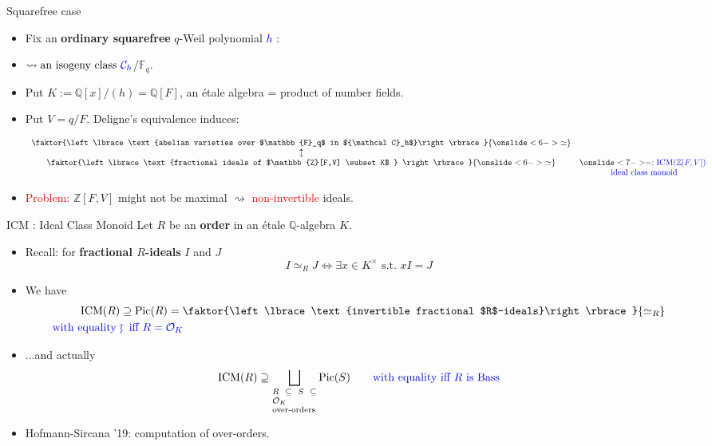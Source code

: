 \documentclass[usenames,dvipsnames,handout]{beamer}
\def\Q{\mathbb{Q}}
\def\Z{\mathbb{Z}}
\def\F{\mathbb{F}}
\DeclareMathOperator{\ICM}{ICM}
\DeclareMathOperator{\Pic}{Pic}
\newcommand{\cC}{{\mathcal C}}
\newcommand{\cO}{{\mathcal O}}
\newcommand{\set}[1]{\left\lbrace#1\right\rbrace }
\newcommand{\red}[1]{\textcolor{red}{#1}}
\newcommand{\blue}[1]{\textcolor{blue}{#1}}
\begin{document}
\begin{frame}{Squarefree case}
	\begin{itemize}
	\item Fix an \textbf{ordinary squarefree} $q$-Weil polynomial \blue{$h$} :
    \item  $\rightsquigarrow \text{an isogeny class } \blue{\cC_h}$/$\F_q$.
    \item Put $K := \Q[x]/(h)=\Q[F]$, an \'etale algebra = product of number fields.
	\item Put $V=q/F$. Deligne's equivalence induces:
			\begin{theorem}
			\[\begin{array}{cc}
			\faktor{\set{\text{abelian varieties over $\F_q$ in $\cC_h$}}}{
\onslide<6->{\simeq}
            } & \\
			\updownarrow & \\
			\faktor{\set{ \text{fractional ideals of $\Z[F,V] \subset K$ } }}{
\onslide<6->{\simeq}
             } &
\onslide<7-> =:  \blue{\ICM(\Z[F,V])}\\ 
			& \blue{\text{ ideal class monoid} }
			  \end{array}\]
			\end{theorem}
    \item \red{Problem:} $\Z[F,V]$ might not be maximal $\rightsquigarrow $ \red{non-invertible} ideals.
	\end{itemize}
\end{frame}

\begin{frame}{ICM : Ideal Class Monoid}
    Let $R$ be an {\bf order} in an \'etale  $\Q$-algebra $K$.
    \begin{itemize}
\pause
    \item Recall: for {\bf fractional $R$-ideals} $I$ and $J$
	 \[ I\simeq_R J \Longleftrightarrow \exists x \in K^\times \text{ s.t.~} xI=J \]
\pause
    \item We have
   	\begin{align*}
    \ICM(R) & \supseteq \Pic(R)=\faktor{\set{\text{invertible fractional $R$-ideals}}}{\simeq_R} \\
	\blue{\text{with equality }} & \blue{\rotatebox[origin=c]{90}{$\large\rightsquigarrow$}\mkern2mu \text{ iff } R=\cO_K }
    \end{align*}
\pause 
    \item ...and actually
    \[ \ICM(R) \supseteq \bigsqcup_{\scriptsize\parbox{5 em}{$R\subseteq S \subseteq \cO_K$\\over-orders}}\Pic(S) \qquad   
     \textcolor{blue}{\text{with equality iff $R$ is Bass}} \]
\pause
    \item Hofmann-Sircana '19: computation of over-orders.
\end{itemize}
\end{frame}
\end{document}
